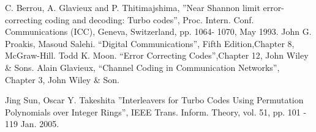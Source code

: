 \documentclass[fontsize=12pt]{article}
\begin{document}
\begin{thebibliography}{99}
  C. Berrou, A. Glavieux and P. Thitimajshima, 
''Near Shannon limit error-correcting coding and
decoding: Turbo codes'', Proc. Intern. Conf. Communications (ICC), Geneva, 
Switzerland, pp. 1064-
1070, May 1993.
 John G. Proakis, Masoud Salehi. ``Digital Communications'', 
Fifth Edition,Chapter 8, McGraw-Hill.
 Todd K. Moon. ``Error Correcting Codes'',Chapter 12, John Wiley \& Sons.
Alain Glavieux, ``Channel Coding in Communication Networks'',\\ Chapter 3, John Wiley \& Son. 

 Jing Sun, Oscar Y. Takeshita ''Interleavers for Turbo Codes Using 
Permutation Polynomials over Integer Rings'', IEEE Trans. Inform. Theory, vol. 51, 
pp. 101 - 119  Jan. 2005.

\end{thebibliography}
\end{document}
